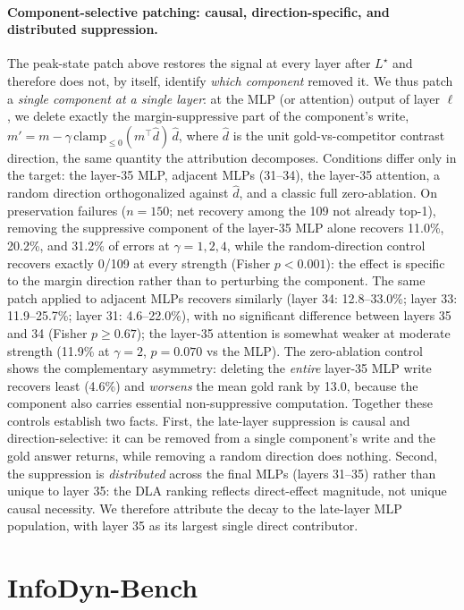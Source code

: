 \documentclass{article} %
\begin{document}
\paragraph{Component-selective patching: causal, direction-specific, and distributed suppression.}
The peak-state patch above restores the signal at every layer after $L^\star$ and therefore does not, by itself, identify \emph{which component} removed it. We thus patch a \emph{single component at a single layer}: at the MLP (or attention) output of layer $\ell$, we delete exactly the margin-suppressive part of the component's write, $m' = m - \gamma\,\mathrm{clamp}_{\le 0}(m^\top \hat{d})\,\hat{d}$, where $\hat{d}$ is the unit gold-vs-competitor contrast direction, the same quantity the attribution decomposes. Conditions differ only in the target: the layer-35 MLP, adjacent MLPs (31--34), the layer-35 attention, a random direction orthogonalized against $\hat{d}$, and a classic full zero-ablation. On preservation failures ($n{=}150$; net recovery among the 109 not already top-1), removing the suppressive component of the layer-35 MLP alone recovers 11.0\%, 20.2\%, and 31.2\% of errors at $\gamma = 1, 2, 4$, while the random-direction control recovers exactly 0/109 at every strength (Fisher $p < 0.001$): the effect is specific to the margin direction rather than to perturbing the component. The same patch applied to adjacent MLPs recovers similarly (layer 34: 12.8--33.0\%; layer 33: 11.9--25.7\%; layer 31: 4.6--22.0\%), with no significant difference between layers 35 and 34 (Fisher $p \ge 0.67$); the layer-35 attention is somewhat weaker at moderate strength (11.9\% at $\gamma{=}2$, $p = 0.070$ vs the MLP). The zero-ablation control shows the complementary asymmetry: deleting the \emph{entire} layer-35 MLP write recovers least (4.6\%) and \emph{worsens} the mean gold rank by 13.0, because the component also carries essential non-suppressive computation. Together these controls establish two facts. First, the late-layer suppression is causal and direction-selective: it can be removed from a single component's write and the gold answer returns, while removing a random direction does nothing. Second, the suppression is \emph{distributed} across the final MLPs (layers 31--35) rather than unique to layer 35: the DLA ranking reflects direct-effect magnitude, not unique causal necessity. We therefore attribute the decay to the late-layer MLP population, with layer 35 as its largest single direct contributor.

\section{InfoDyn-Bench}
\end{document}
